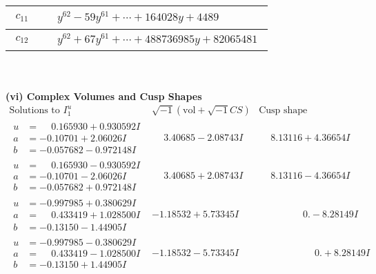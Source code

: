 \documentclass[1p]{elsarticle_modified}
\theoremstyle{definition}
\newcommand{\I}{\sqrt{-1}}
\begin{document}
\begin{tabular}{m{50pt}|m{274pt}}
\hline $$\begin{aligned}c_{11}\end{aligned}$$&$\begin{aligned}
&y^{62}-59 y^{61}+\cdots+164028 y+4489
\end{aligned}$\\
\hline $$\begin{aligned}c_{12}\end{aligned}$$&$\begin{aligned}
&y^{62}+67 y^{61}+\cdots+488736985 y+82065481
\end{aligned}$\\
\hline
\end{tabular}\\~\\
\newpage\flushleft \textbf{(vi) Complex Volumes and Cusp Shapes}
$$\begin{array}{c|c|c}  
\text{Solutions to }I^u_{1}& \I (\text{vol} + \sqrt{-1}CS) & \text{Cusp shape}\\
 \hline 
\begin{aligned}
u &= \phantom{-}0.165930 + 0.930592 I \\
a &= -0.10701 + 2.06026 I \\
b &= -0.057682 - 0.972148 I\end{aligned}
 & \phantom{-}3.40685 - 2.08743 I & \phantom{-}8.13116 + 4.36654 I \\ \hline\begin{aligned}
u &= \phantom{-}0.165930 - 0.930592 I \\
a &= -0.10701 - 2.06026 I \\
b &= -0.057682 + 0.972148 I\end{aligned}
 & \phantom{-}3.40685 + 2.08743 I & \phantom{-}8.13116 - 4.36654 I \\ \hline\begin{aligned}
u &= -0.997985 + 0.380629 I \\
a &= \phantom{-}0.433419 + 1.028500 I \\
b &= -0.13150 - 1.44905 I\end{aligned}
 & -1.18532 + 5.73345 I & \phantom{-0.000000 } 0. - 8.28149 I \\ \hline\begin{aligned}
u &= -0.997985 - 0.380629 I \\
a &= \phantom{-}0.433419 - 1.028500 I \\
b &= -0.13150 + 1.44905 I\end{aligned}
 & -1.18532 - 5.73345 I & \phantom{-0.000000 -}0. + 8.28149 I \\ \hline\begin{aligned}

\end{aligned}
\end{array}$$
\end{document}

